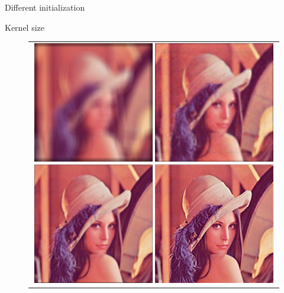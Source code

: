\documentclass[french]{beamer}
\theoremstyle{plain}
\theoremstyle{remark}
\begin{document}
\begin{frame}{Different initialization}
\end{frame}

\begin{frame}{Kernel size}

\begin{figure}
\begin{center}
	\begin{tabular}{c}	
		\includegraphics[scale=0.5]{images/blurred_15_5.png}
		\includegraphics[scale=0.5]{images/estimation_15_5.png}
		\includegraphics[scale=0.5]{images/blurred_3_9.png}
		\includegraphics[scale=0.5]{images/estimation_3_9.png}
	\end{tabular}
\end{center}
\end{figure}

\end{frame}
\end{document}
